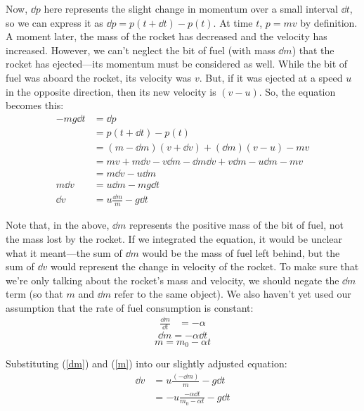 \documentclass{article}
\begin{document}
Now, $\dd{p}$ here represents the slight change in momentum over a small interval $\dd{t}$, so we can express it as $\dd{p} = p(t+\dd{t}) - p(t)$. At time $t$, $p = mv$ by definition. A moment later, the mass of the rocket has decreased and the velocity has increased. However, we can't neglect the bit of fuel (with mass $\dd{m}$) that the rocket has ejected---its momentum must be considered as well. While the bit of fuel was aboard the rocket, its velocity was $v$. But, if it was ejected at a speed $u$ in the opposite direction, then its new velocity is $(v-u)$. So, the equation becomes this:
\begin{equation*}
\begin{aligned}
-mg\dd{t} &= \dd{p} \\
&= p(t+\dd{t}) - p(t) \\
&= (m - \dd{m})(v + \dd{v}) + (\dd{m})(v - u) - mv \\
&= mv + m\dd{v} - v\dd{m} - \dd{m}\dd{v} + v\dd{m} - u\dd{m} - mv \\
&= m\dd{v} - u\dd{m} \\
m\dd{v} &= u\dd{m} - mg\dd{t} \\
\dd{v} &= u\frac{\dd{m}}{m} - g\dd{t}
\end{aligned}
\end{equation*}

Note that, in the above, $\dd{m}$ represents the positive mass of the bit of fuel, not the mass lost by the rocket. If we integrated the equation, it would be unclear what it meant---the sum of $\dd{m}$ would be the mass of fuel left behind, but the sum of $\dd{v}$ would represent the change in velocity of the rocket. To make sure that we're only talking about the rocket's mass and velocity, we should negate the $\dd{m}$ term (so that $m$ and $\dd{m}$ refer to the same object). We also haven't yet used our assumption that the rate of fuel consumption is constant:
\begin{equation*}
\begin{aligned}
\frac{\dd{m}}{\dd{t}} &= -\alpha
\end{aligned}
\end{equation*}
\begin{equation}\label{dm}
\dd{m} = -\alpha\dd{t}
\end{equation}
\begin{equation}\label{m}
m = m_0 - \alpha t
\end{equation}

Substituting (\ref{dm}) and (\ref{m}) into our slightly adjusted equation:
\begin{equation}
\begin{aligned}
\dd{v} &= u\frac{(-\dd{m})}{m} - g\dd{t} \\
&= -u\frac{-\alpha \dd{t}}{m_0-\alpha t} -g\dd{t}
\end{aligned}
\end{equation}
\end{document}
